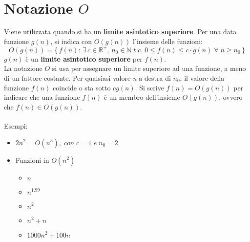 \documentclass[10pt, a4paper]{report}
\begin{document}
\section{Notazione $O$}
Viene utilizzata quando si ha un \textbf{limite asintotico superiore}. Per una data funzione $g(n)$, si indica con $O(g(n))$ l'insieme delle funzioni:
\begin{equation*}
O(g(n)) = \{\,f(n) :\,\exists \,c\in\mathbb{R^+},\,n_0\in\mathbb{N}\;t.c.\;0\leq f(n)\leq c\cdot g(n)\;\forall\;n\geq n_0\,\}
\end{equation*}
$g(n)$ è un \textbf{limite asintotico superiore} per $f(n)$.\\
La notazione $O$ si usa per assegnare un limite superiore ad una funzione, a meno di un fattore costante. Per qualsiasi valore \textit{n} a destra di $n_0$, il valore della funzione $f(n)$ coincide o sta sotto $cg(n)$. Si scrive $f(n) = O(g(n))$ per indicare che una funzione $f(n)$ è un membro dell'insieme $O(g(n))$, ovvero che $f(n) \in O(g(n))$.\\\\
Esempi:
\begin{itemize}
\item$2n^2 = O(n^3),\;con\;c = 1\;e\;n_0 = 2$
\item Funzioni in $O(n^2)$
\begin{itemize}
\item$n$
\item$n^{1.99}$
\item$n^2$
\item$n^2 + n$
\item$1000n^2 + 100n$
\end{itemize}
\end{itemize}
\end{document}

